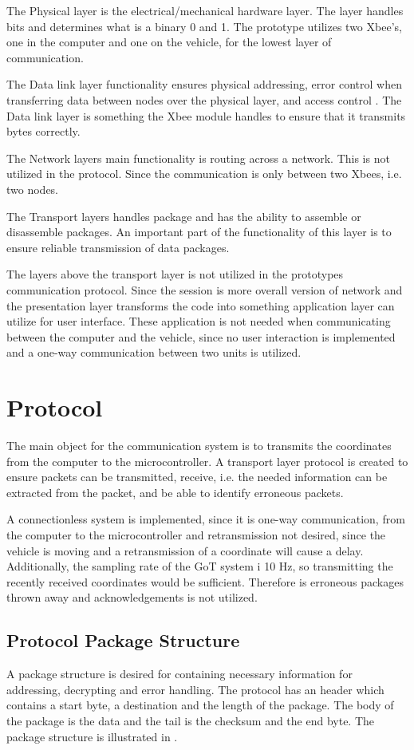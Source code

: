 The Physical layer is the electrical/mechanical hardware layer. The layer handles bits and determines what is a binary 0 and 1. The prototype utilizes two Xbee's, one in the computer and one on the vehicle, for the lowest layer of communication.

The Data link layer functionality ensures physical addressing, error control when transferring data between nodes over the physical layer, and access control \cite{J.M.Network}. The Data link layer is something the Xbee module handles to ensure that it transmits bytes correctly.

The Network layers main functionality is routing across a network. This is not utilized in the protocol. Since the communication is only between two Xbees, i.e. two nodes. 

The Transport layers handles package and has the ability to assemble or disassemble packages. An important part of the functionality of this layer is to ensure reliable transmission of data packages.

The layers above the transport layer is not utilized in the prototypes communication protocol. Since the session is more overall version of network and the presentation layer transforms the code into something application layer can utilize for user interface. These application is not needed when communicating between the computer and the vehicle, since no user interaction is implemented and a one-way communication between two units is utilized. 

\section{Protocol}
The main object for the communication system is to transmits the coordinates from the computer to the microcontroller. A transport layer protocol is created to ensure packets can be transmitted, receive, i.e. the needed information can be extracted from the packet, and be able to identify erroneous packets.

A connectionless system is implemented, since it is one-way communication, from the computer to the microcontroller and retransmission not desired, since the vehicle is moving and a retransmission of a coordinate will cause a delay. Additionally, the sampling rate of the GoT system i 10 \si{Hz}, so transmitting the recently received coordinates would be sufficient. Therefore is erroneous packages thrown away and acknowledgements is not utilized.

\subsection{Protocol Package Structure}
A package structure is desired for containing necessary information for addressing, decrypting and error handling. The protocol has an header which contains a start byte, a destination and the length of the package. The body of the package is the data and the tail is the checksum and the end byte. The package structure is illustrated in .

